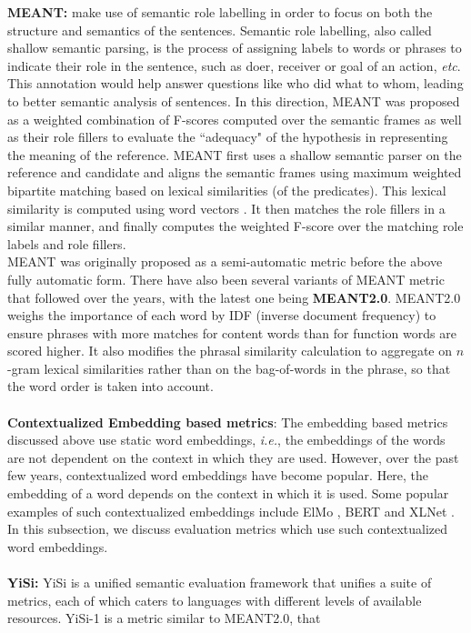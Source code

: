 \textbf{MEANT: }  make use of semantic role labelling in order to focus on both the structure and semantics of the sentences. Semantic role labelling, also called shallow semantic parsing, is the process of assigning labels to words or phrases to indicate their role in the sentence, such as doer, receiver or goal of an action, \textit{etc}. This annotation would help answer questions like who did what to whom, leading to better semantic analysis of sentences. In this direction, MEANT was proposed as a weighted combination of F-scores computed over the semantic frames as well as their role fillers to evaluate the ``adequacy" of the hypothesis in representing the meaning of the reference. MEANT first uses a shallow semantic parser on the reference and candidate and aligns the semantic frames using maximum weighted bipartite matching based on lexical similarities (of the predicates). This lexical similarity is computed using word vectors . It then matches the role fillers in a similar manner, and finally computes the weighted F-score over the matching role labels and role fillers.\\
MEANT was originally proposed as a semi-automatic metric  before the above fully automatic form. There have also been several variants  of MEANT metric that followed over the years, with the latest one being \textbf{MEANT2.0}. MEANT2.0 weighs the importance of each word by IDF (inverse document frequency) to ensure phrases with more matches for content words than for function words are scored higher. It also modifies the phrasal similarity calculation to aggregate on $n$-gram lexical similarities rather than on the bag-of-words in the phrase, so that the word order is taken into account. \\
\hfill\\
\textbf{Contextualized Embedding based metrics}:
The embedding based metrics discussed above use static word embeddings, \textit{i.e.}, the embeddings of the words are not dependent on the context in which they are used. However, over the past few years, contextualized word embeddings have become popular. Here, the embedding of a word depends on the context in which it is used. 
Some popular examples of such contextualized embeddings include ElMo  , BERT  and XLNet . In this subsection, we discuss evaluation metrics which use such contextualized word embeddings.\\
\\
\textbf{YiSi:}  YiSi  is a unified semantic evaluation framework that unifies a suite of metrics, each of which caters to languages with different levels of available resources. YiSi-1 is a metric similar to MEANT2.0, that 
